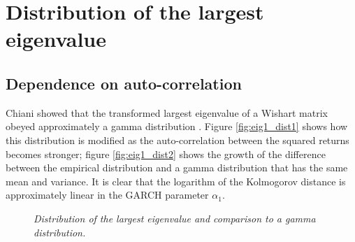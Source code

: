 \documentclass{article}
\begin{document}
\section{Distribution of the largest eigenvalue}
\subsection{Dependence on auto-correlation}
Chiani showed that the transformed largest eigenvalue of a Wishart
matrix obeyed approximately a gamma distribution \cite{Chiani2012}. Figure
\ref{fig:eig1_dist1} shows how this distribution is modified as the
auto-correlation between the squared returns becomes stronger; figure
\ref{fig:eig1_dist2} shows the growth of the difference between the
empirical distribution and a gamma distribution that has the same
mean and variance. It is clear that the logarithm of the Kolmogorov
distance is approximately linear in the GARCH parameter $\alpha_1$.

\begin{figure}[htb!]
  \centering
  \caption{\small \it Distribution of the largest eigenvalue and
    comparison to a gamma distribution.}
  \label{fig:eig1_dist}
\end{figure}
\end{document}
